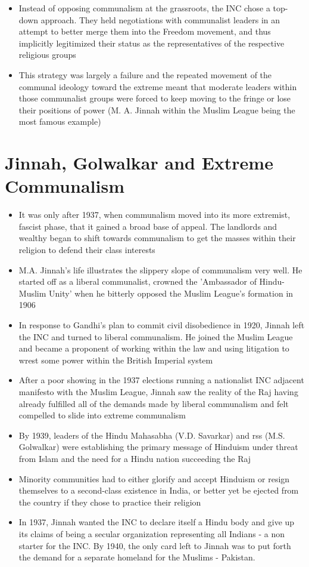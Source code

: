 \begin{itemize}
    \item Instead of opposing communalism at the grassroots, the INC chose a top-down approach. They held negotiations with communalist leaders in an attempt to better merge them into the Freedom movement, and thus implicitly legitimized their status as the representatives of the respective religious groups
    \item This strategy was largely a failure and the repeated movement of the communal ideology toward the extreme meant that moderate leaders within those communalist groups were forced to keep moving to the fringe or lose their positions of power (M. A. Jinnah within the Muslim League being the most famous example)
\end{itemize}

\section{Jinnah, Golwalkar and Extreme Communalism}
\begin{itemize}
    \item It was only after 1937, when communalism moved into its more extremist, fascist phase, that it gained a broad base of appeal. The landlords and wealthy began to shift towards communalism to get the masses within their religion to defend their class interests
    \item M.A. Jinnah's life illustrates the slippery slope of communalism very well. He started off as a liberal communalist, crowned the 'Ambassador of Hindu-Muslim Unity' when he bitterly opposed the Muslim League's formation in 1906
    \item In response to Gandhi's plan to commit civil disobedience in 1920, Jinnah left the INC and turned to liberal communalism. He joined the Muslim League and became a proponent of working within the law and using litigation to wrest some power within the British Imperial system
    \item After a poor showing in the 1937 elections running a nationalist INC adjacent manifesto with the Muslim League, Jinnah saw the reality of the Raj having already fulfilled all of the demands made by liberal communalism and felt compelled to slide into extreme communalism
    \item By 1939, leaders of the Hindu Mahasabha (V.D. Savarkar) and \gls{rss} (M.S. Golwalkar) were establishing the primary message of Hinduism under threat from Islam and the need for a Hindu nation succeeding the Raj
    \item Minority communities had to either glorify and accept Hinduism or resign themselves to a second-class existence in India, or better yet be ejected from the country if they chose to practice their religion
    \item In 1937, Jinnah wanted the INC to declare itself a Hindu body and give up its claims of being a secular organization representing all Indians - a non starter for the INC. By 1940, the only card left to Jinnah was to put forth the demand for a separate homeland for the Muslims - Pakistan.
\end{itemize}

